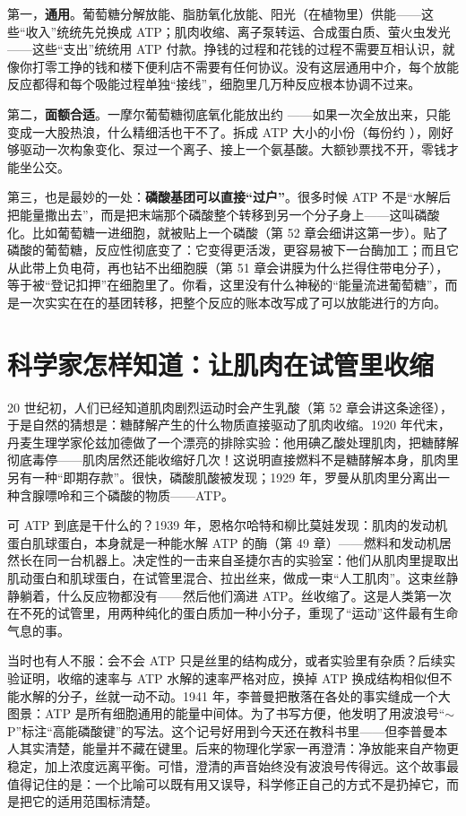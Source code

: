 第一，\textbf{通用}。葡萄糖分解放能、脂肪氧化放能、阳光（在植物里）供能——这些“收入”统统先兑换成 ATP；肌肉收缩、离子泵转运、合成蛋白质、萤火虫发光——这些“支出”统统用 ATP 付款。挣钱的过程和花钱的过程不需要互相认识，就像你打零工挣的钱和楼下便利店不需要有任何协议。没有这层通用中介，每个放能反应都得和每个吸能过程单独“接线”，细胞里几万种反应根本协调不过来。

第二，\textbf{面额合适}。一摩尔葡萄糖彻底氧化能放出约 ——如果一次全放出来，只能变成一大股热浪，什么精细活也干不了。拆成 ATP 大小的小份（每份约 ），刚好够驱动一次构象变化、泵过一个离子、接上一个氨基酸。大额钞票找不开，零钱才能坐公交。

第三，也是最妙的一处：\textbf{磷酸基团可以直接“过户”}。很多时候 ATP 不是“水解后把能量撒出去”，而是把末端那个磷酸整个转移到另一个分子身上——这叫磷酸化。比如葡萄糖一进细胞，就被贴上一个磷酸（第 52 章会细讲这第一步）。贴了磷酸的葡萄糖，反应性彻底变了：它变得更活泼，更容易被下一台酶加工；而且它从此带上负电荷，再也钻不出细胞膜（第 51 章会讲膜为什么拦得住带电分子），等于被“登记扣押”在细胞里了。你看，这里没有什么神秘的“能量流进葡萄糖”，而是一次实实在在的基团转移，把整个反应的账本改写成了可以放能进行的方向。

\section{科学家怎样知道：让肌肉在试管里收缩}

\begin{zhengju}
20 世纪初，人们已经知道肌肉剧烈运动时会产生乳酸（第 52 章会讲这条途径），于是自然的猜想是：糖酵解产生的什么物质直接驱动了肌肉收缩。1920 年代末，丹麦生理学家伦兹加德做了一个漂亮的排除实验：他用碘乙酸处理肌肉，把糖酵解彻底毒停——肌肉居然还能收缩好几次！这说明直接燃料不是糖酵解本身，肌肉里另有一种“即期存款”。很快，磷酸肌酸被发现；1929 年，罗曼从肌肉里分离出一种含腺嘌呤和三个磷酸的物质——ATP。

可 ATP 到底是干什么的？1939 年，恩格尔哈特和柳比莫娃发现：肌肉的发动机蛋白肌球蛋白，本身就是一种能水解 ATP 的酶（第 49 章）——燃料和发动机居然长在同一台机器上。决定性的一击来自圣捷尔吉的实验室：他们从肌肉里提取出肌动蛋白和肌球蛋白，在试管里混合、拉出丝来，做成一束“人工肌肉”。这束丝静静躺着，什么反应物都没有——然后他们滴进 ATP。丝收缩了。这是人类第一次在不死的试管里，用两种纯化的蛋白质加一种小分子，重现了“运动”这件最有生命气息的事。

当时也有人不服：会不会 ATP 只是丝里的结构成分，或者实验里有杂质？后续实验证明，收缩的速率与 ATP 水解的速率严格对应，换掉 ATP 换成结构相似但不能水解的分子，丝就一动不动。1941 年，李普曼把散落在各处的事实缝成一个大图景：ATP 是所有细胞通用的能量中间体。为了书写方便，他发明了用波浪号“$\sim$P”标注“高能磷酸键”的写法。这个记号好用到今天还在教科书里——但李普曼本人其实清楚，能量并不藏在键里。后来的物理化学家一再澄清：净放能来自产物更稳定，加上浓度远离平衡。可惜，澄清的声音始终没有波浪号传得远。这个故事最值得记住的是：一个比喻可以既有用又误导，科学修正自己的方式不是扔掉它，而是把它的适用范围标清楚。
\end{zhengju}
